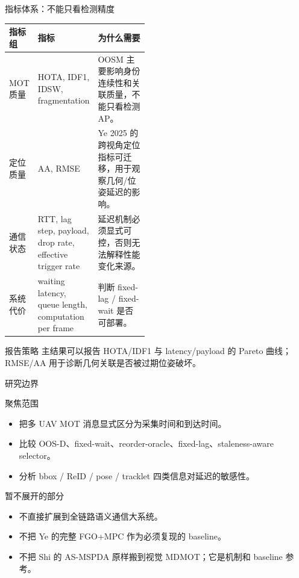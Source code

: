 \documentclass[aspectratio=169,xcolor=dvipsnames]{beamer}
\begin{document}
\begin{frame}{指标体系：不能只看检测精度}
\scriptsize
\begin{tabularx}{\linewidth}{p{0.20\linewidth} p{0.26\linewidth} X}
\toprule
指标组 & 指标 & 为什么需要 \\
\midrule
MOT 质量 & HOTA, IDF1, IDSW, fragmentation & OOSM 主要影响身份连续性和关联质量，不能只看检测 AP。 \\
\addlinespace
定位质量 & AA, RMSE & Ye 2025 的跨视角定位指标可迁移，用于观察几何/位姿延迟的影响。 \\
\addlinespace
通信状态 & RTT, lag step, payload, drop rate, effective trigger rate & 延迟机制必须显式可控，否则无法解释性能变化来源。 \\
\addlinespace
系统代价 & waiting latency, queue length, computation per frame & 判断 fixed-lag / fixed-wait 是否可部署。 \\
\bottomrule
\end{tabularx}

\vspace{1mm}
\begin{block}{报告策略}
主结果可以报告 HOTA/IDF1 与 latency/payload 的 Pareto 曲线；RMSE/AA 用于诊断几何关联是否被过期位姿破坏。
\end{block}
\end{frame}

\begin{frame}{研究边界}
\small
\begin{block}{聚焦范围}
\begin{itemize}
  \item 把多 UAV MOT 消息显式区分为采集时间和到达时间。
  \item 比较 OOS-D、fixed-wait、reorder-oracle、fixed-lag、staleness-aware selector。
  \item 分析 bbox / ReID / pose / tracklet 四类信息对延迟的敏感性。
\end{itemize}
\end{block}

\begin{alertblock}{暂不展开的部分}
\begin{itemize}
  \item 不直接扩展到全链路语义通信大系统。
  \item 不把 Ye 的完整 FGO+MPC 作为必须复现的 baseline。
  \item 不把 Shi 的 AS-MSPDA 原样搬到视觉 MDMOT；它是机制和 baseline 参考。
\end{itemize}
\end{alertblock}
\end{frame}
\end{document}
